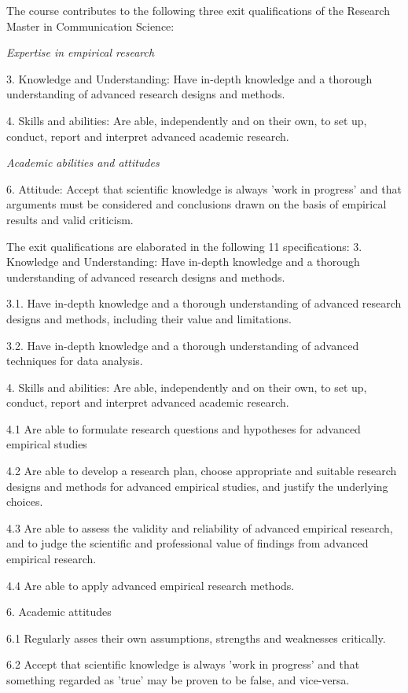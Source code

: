 \documentclass[a4paper,12pt]{report}
\begin{document}
The course contributes to the following three exit qualifications of the Research Master in Communication Science: 


\textit{Expertise in empirical research}


	3.	Knowledge and Understanding: Have in-depth knowledge and a thorough understanding of advanced research designs and methods.


	4.	Skills and abilities: Are able, independently and on their own, to set up, conduct, report and interpret advanced academic research.


\textit{Academic abilities and attitudes}


	6.	Attitude: Accept that scientific knowledge is always 'work in progress' and that arguments must be considered and conclusions drawn on the basis of empirical results and valid criticism.


The exit qualifications are elaborated in the following 11 specifications:
3. Knowledge and Understanding: Have in-depth knowledge and a thorough understanding of advanced research designs and methods. 


3.1. Have in-depth knowledge and a thorough understanding of advanced research designs and methods, including their value and limitations.


3.2.	Have in-depth knowledge and a thorough understanding of advanced techniques for data analysis.


4. Skills and abilities: Are able, independently and on their own, to set up, conduct, report and interpret advanced academic research.


4.1	Are able to formulate research questions and hypotheses for advanced empirical studies


4.2	Are able to develop a research plan, choose appropriate and suitable research designs and methods for advanced empirical studies, and justify the underlying choices. 


4.3	Are able to assess the validity and reliability of advanced empirical research, and to judge the scientific and professional value of findings from advanced empirical research.


4.4	Are able to apply advanced empirical research methods.


6. Academic attitudes


6.1 	Regularly asses their own assumptions, strengths and weaknesses critically.


6.2	Accept that scientific knowledge is always 'work in progress' and that something regarded as 'true' may be proven to be false, and vice-versa.
\end{document}
